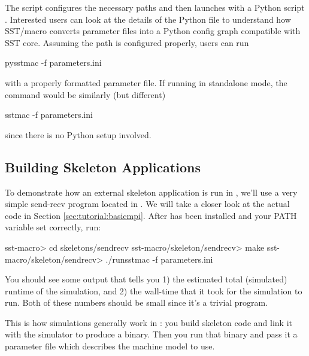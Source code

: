 
The script configures the necessary paths and then launches with a Python script .  Interested users can look at the details of the Python file to understand how SST/macro converts parameter files into a Python config graph compatible with SST core.
Assuming the path is configured properly, users can run

\begin{ShellCmd}
pysstmac -f parameters.ini
\end{ShellCmd}
with a properly formatted parameter file. If running in standalone mode, the command would be similarly (but different)

\begin{ShellCmd}
sstmac -f parameters.ini
\end{ShellCmd}
since there is no Python setup involved.

\subsection{Building Skeleton Applications}
\label{sec:tutorial:runapp}

To demonstrate how an external skeleton application is run in \sstmacro, we'll use a very simple send-recv program located in .
We will take a closer look at the actual code in Section \ref{sec:tutorial:basicmpi}.
After \sstmacro has been installed and your PATH variable set correctly, run: 

\begin{ShellCmd}
sst-macro> cd skeletons/sendrecv
sst-macro/skeleton/sendrecv> make
sst-macro/skeleton/sendrecv> ./runsstmac -f parameters.ini
\end{ShellCmd}

You should see some output that tells you 1) the estimated total (simulated) runtime of the simulation, and 
2) the wall-time that it took for the simulation to run.  
Both of these numbers should be small since it's a trivial program. 

This is how simulations generally work in \sstmacro: you build skeleton code and link it with the simulator to produce a binary.  
Then you run that binary and pass it a parameter file which describes the machine model to use.

